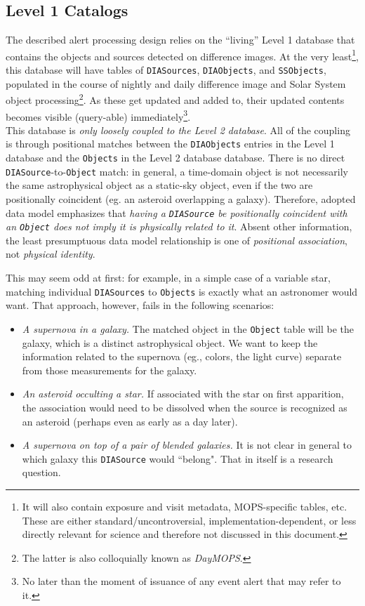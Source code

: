 \documentclass[12pt]{article}
\newcommand{\code}[1]{\texttt{#1}}
\newcommand{\DIASource}{\code{DIASource}\xspace}
\newcommand{\DIASources}{\code{DIASources}\xspace}
\newcommand{\DIAObjects}{\code{DIAObjects}\xspace}
\newcommand{\DB}{{Level 1 database}\xspace}
\newcommand{\DR}{{Level 2 database}\xspace}
\newcommand{\Object}{\code{Object}\xspace}
\newcommand{\Objects}{\code{Objects}\xspace}
\newcommand{\SSObjects}{\code{SSObjects}\xspace}
\newcommand{\req}[1]{\marginpar{\tiny #1}}
\newcommand{\dmreq}[1]{\req{DMS-REQ-#1}}
\begin{document}
\subsection{Level 1 Catalogs}
\label{sec:level1db}

The described alert processing design relies on the ``living'' \DB that contains the objects and sources detected on difference images. At the very least\footnote{It will also contain exposure and visit metadata, MOPS-specific tables, etc. These are either standard/uncontroversial, implementation-dependent, or less directly relevant for science and therefore not discussed in this document.}, this database will have tables of \DIASources,\dmreq{0269} \DIAObjects,\dmreq{0271} and \SSObjects,\dmreq{0273} populated in the course of nightly and daily difference image and Solar System object processing\footnote{The latter is also colloquially known as {\em DayMOPS}.}. As these get updated and added to, their updated contents becomes visible (query-able) immediately\footnote{No later than the moment of issuance of any event alert that may refer to it.}.\dmreq{0312}
\\

This database is {\em only loosely coupled to the \DR}. All of the coupling is through positional matches between the \DIAObjects entries in the \DB and the \Objects in the \DR database. There is no direct \DIASource-to-\Object match:
in general, a time-domain object is not necessarily the same astrophysical object as a static-sky object, even if the two are
positionally coincident (eg. an asteroid overlapping a galaxy).
Therefore, adopted data model emphasizes that {\em having a \DIASource be positionally coincident with an \Object does not imply it is physically related to it}. Absent other information, the least presumptuous data model relationship is one of {\em positional association}, not {\em physical identity}.

This may seem odd at first: for example, in a simple case of a variable star, matching individual \DIASources to \Objects is exactly what an astronomer would want. That approach, however, fails in the following scenarios:
\begin{itemize}
\item {\em A supernova in a galaxy.} The matched object in the \Object table will be the galaxy, which is a distinct astrophysical object. We want to keep the information related to the supernova (eg., colors, the light curve) separate from those measurements for the galaxy.
\item {\em An asteroid occulting a star.} If associated with the star on first apparition, the association would need to be dissolved when the source is recognized as an asteroid (perhaps even as early as a day later).
\item {\em A supernova on top of a pair of blended galaxies.} It is not clear in general to which galaxy this \DIASource would ``belong". That in itself is a research question.
\end{itemize}
\end{document}
